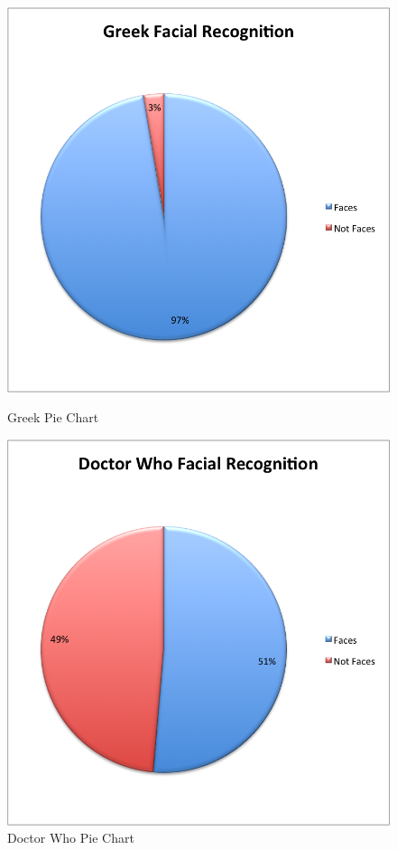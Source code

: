\begin{figure}[h1]
\begin{minipage}[b]{0.5\linewidth}
\includegraphics[scale=0.55]{Images/GreekFaces1.png}
\caption{Greek Pie Chart}
 \label{fig:GreekFD}
\end{minipage}
\hspace{0.5cm}
\begin{minipage}[b]{0.5\linewidth}
\includegraphics[scale=0.55]{Images/DrWhoFaces1.png}
\caption{Doctor Who Pie Chart}
 \label{fig:DrWhoFD}
\end{minipage}
\end{figure}

